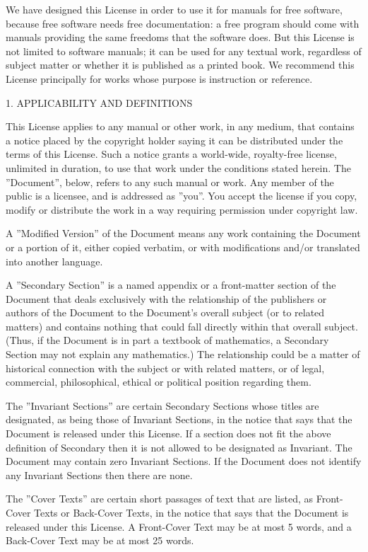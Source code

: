We have designed this License in order to use it for manuals for free software, because free software needs free
documentation: a free program should come with manuals providing the same freedoms that the software does. But this
License is not limited to software manuals; it can be used for any textual work, regardless of subject matter or
whether it is published as a printed book. We recommend this License principally for works whose purpose is instruction
or reference.

1. APPLICABILITY AND DEFINITIONS

This License applies to any manual or other work, in any medium, that contains a notice placed by the copyright holder
saying it can be distributed under the terms of this License. Such a notice grants a world-wide, royalty-free license,
unlimited in duration, to use that work under the conditions stated herein. The ''Document'', below, refers to any such
manual or work. Any member of the public is a licensee, and is addressed as ''you''. You accept the license if you
copy, modify or distribute the work in a way requiring permission under copyright law.

A ''Modified Version'' of the Document means any work containing the Document or a portion of it, either copied
verbatim, or with modifications and/or translated into another language.

A ''Secondary Section'' is a named appendix or a front-matter section of the Document that deals exclusively with the
relationship of the publishers or authors of the Document to the Document's overall subject (or to related matters) and
contains nothing that could fall directly within that overall subject. (Thus, if the Document is in part a textbook of
mathematics, a Secondary Section may not explain any mathematics.) The relationship could be a matter of historical
connection with the subject or with related matters, or of legal, commercial, philosophical, ethical or political
position regarding them.

The ''Invariant Sections'' are certain Secondary Sections whose titles are designated, as being those of Invariant
Sections, in the notice that says that the Document is released under this License. If a section does not fit the above
definition of Secondary then it is not allowed to be designated as Invariant. The Document may contain zero Invariant
Sections. If the Document does not identify any Invariant Sections then there are none.

The ''Cover Texts'' are certain short passages of text that are listed, as Front-Cover Texts or Back-Cover Texts, in
the notice that says that the Document is released under this License. A Front-Cover Text may be at most 5 words, and a
Back-Cover Text may be at most 25 words.


